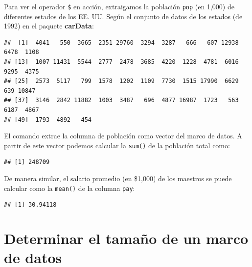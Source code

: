 \documentclass[
]{book}
\newenvironment{Shaded}{\begin{snugshade}}{\end{snugshade}}
\newcommand{\KeywordTok}[1]{\textcolor[rgb]{0.13,0.29,0.53}{\textbf{#1}}}
\newcommand{\NormalTok}[1]{#1}
\newcommand{\OperatorTok}[1]{\textcolor[rgb]{0.81,0.36,0.00}{\textbf{#1}}}
\begin{document}
Para ver el operador \texttt{\$} en acción, extraigamos la población \texttt{pop} (en 1,000) de diferentes estados de los EE. UU. Según el conjunto de datos de los estados (de 1992) en el paquete \textbf{carData}:

\begin{Shaded}
\end{Shaded}

\begin{verbatim}
##  [1]  4041   550  3665  2351 29760  3294  3287   666   607 12938  6478  1108
## [13]  1007 11431  5544  2777  2478  3685  4220  1228  4781  6016  9295  4375
## [25]  2573  5117   799  1578  1202  1109  7730  1515 17990  6629   639 10847
## [37]  3146  2842 11882  1003  3487   696  4877 16987  1723   563  6187  4867
## [49]  1793  4892   454
\end{verbatim}

El comando extrae la columna de población como vector del marco de datos. A partir de este vector podemos calcular la \texttt{sum()} de la población total como:

\begin{Shaded}
\end{Shaded}

\begin{verbatim}
## [1] 248709
\end{verbatim}

De manera similar, el salario promedio (en \$1,000) de los maestros se puede calcular como la \texttt{mean()} de la columna \texttt{pay}:

\begin{Shaded}
\end{Shaded}

\begin{verbatim}
## [1] 30.94118
\end{verbatim}

\hypertarget{determinar-el-tamauxf1o-de-un-marco-de-datos}{%
\section{Determinar el tamaño de un marco de datos}\label{determinar-el-tamauxf1o-de-un-marco-de-datos}}
\end{document}
